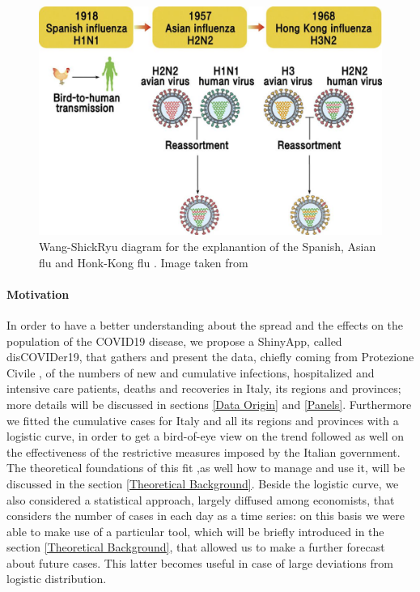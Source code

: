 \documentclass[
12pt, %
a4paper, %
oneside, %
headinclude,footinclude, %
BCOR5mm, %
]{scrartcl}
\begin{document}
\begin{figure}[h]
 \centering
 \includegraphics[width=0.8\linewidth]{Figures/Mixing_Flu.jpg} 
 \caption{Wang-ShickRyu diagram for the explanantion of the Spanish, Asian flu and Honk-Kong flu . Image taken from  \cite{RYU2017195}}
 \label{Mixing_Flu}
\end{figure}




\paragraph{Motivation} \label{Motivation}
In order to have a better understanding about the spread and the effects on the population of the COVID19 disease, we propose a ShinyApp, called disCOVIDer19, that gathers and present the data, chiefly coming from Protezione Civile \cite{protezionecivile+git}, of the numbers of new and cumulative infections, hospitalized and intensive care patients, deaths and recoveries in Italy, its regions and provinces; more details will be discussed in sections \ref{Data Origin} and \ref{Panels}. Furthermore we fitted the cumulative cases for Italy and all its regions and provinces with a logistic curve, in order to get a bird-of-eye view on the trend followed as well on the effectiveness of the restrictive measures imposed by the Italian government. The theoretical foundations of this fit ,as well how to manage and use it, will be discussed in the section \ref{Theoretical Background}. Beside the logistic curve, we also considered a statistical approach, largely diffused among economists, that considers the number of cases in each day as a time series: on this basis we were able to make use of a particular tool, which will be briefly introduced in the section \ref{Theoretical Background}, that allowed us to  make a further forecast  about future cases.  This latter becomes useful in case of large deviations from logistic distribution. 
 
\end{document}
